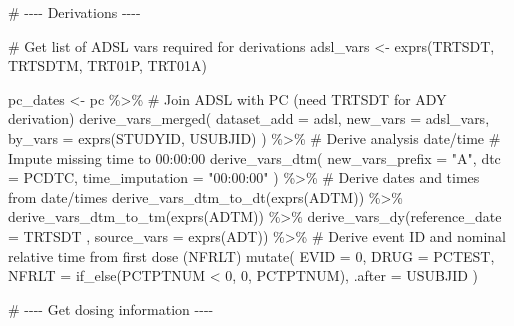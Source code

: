 \documentclass[
  letterpaper,
  DIV=11,
  numbers=noendperiod]{scrreprt}
\newenvironment{Shaded}{\begin{snugshade}}{\end{snugshade}}
\newcommand{\AttributeTok}[1]{\textcolor[rgb]{0.40,0.45,0.13}{#1}}
\newcommand{\CommentTok}[1]{\textcolor[rgb]{0.37,0.37,0.37}{#1}}
\newcommand{\DecValTok}[1]{\textcolor[rgb]{0.68,0.00,0.00}{#1}}
\newcommand{\FunctionTok}[1]{\textcolor[rgb]{0.28,0.35,0.67}{#1}}
\newcommand{\NormalTok}[1]{\textcolor[rgb]{0.00,0.23,0.31}{#1}}
\newcommand{\OtherTok}[1]{\textcolor[rgb]{0.00,0.23,0.31}{#1}}
\newcommand{\SpecialCharTok}[1]{\textcolor[rgb]{0.37,0.37,0.37}{#1}}
\newcommand{\StringTok}[1]{\textcolor[rgb]{0.13,0.47,0.30}{#1}}
\begin{document}
\begin{Shaded}
\begin{Highlighting}[]
\CommentTok{\# {-}{-}{-}{-} Derivations {-}{-}{-}{-}}

\CommentTok{\# Get list of ADSL vars required for derivations}
\NormalTok{adsl\_vars }\OtherTok{\textless{}{-}} \FunctionTok{exprs}\NormalTok{(TRTSDT, TRTSDTM, TRT01P, TRT01A)}

\NormalTok{pc\_dates }\OtherTok{\textless{}{-}}\NormalTok{ pc }\SpecialCharTok{\%\textgreater{}\%}
  \CommentTok{\# Join ADSL with PC (need TRTSDT for ADY derivation)}
  \FunctionTok{derive\_vars\_merged}\NormalTok{(}
    \AttributeTok{dataset\_add =}\NormalTok{ adsl,}
    \AttributeTok{new\_vars =}\NormalTok{ adsl\_vars,}
    \AttributeTok{by\_vars =} \FunctionTok{exprs}\NormalTok{(STUDYID, USUBJID)}
\NormalTok{  ) }\SpecialCharTok{\%\textgreater{}\%}
  \CommentTok{\# Derive analysis date/time}
  \CommentTok{\# Impute missing time to 00:00:00}
  \FunctionTok{derive\_vars\_dtm}\NormalTok{(}
    \AttributeTok{new\_vars\_prefix =} \StringTok{"A"}\NormalTok{,}
    \AttributeTok{dtc =}\NormalTok{ PCDTC,}
    \AttributeTok{time\_imputation =} \StringTok{"00:00:00"}
\NormalTok{  ) }\SpecialCharTok{\%\textgreater{}\%}
  \CommentTok{\# Derive dates and times from date/times}
  \FunctionTok{derive\_vars\_dtm\_to\_dt}\NormalTok{(}\FunctionTok{exprs}\NormalTok{(ADTM)) }\SpecialCharTok{\%\textgreater{}\%}
  \FunctionTok{derive\_vars\_dtm\_to\_tm}\NormalTok{(}\FunctionTok{exprs}\NormalTok{(ADTM)) }\SpecialCharTok{\%\textgreater{}\%}
  \FunctionTok{derive\_vars\_dy}\NormalTok{(}\AttributeTok{reference\_date =}\NormalTok{ TRTSDT ,}
                 \AttributeTok{source\_vars =} \FunctionTok{exprs}\NormalTok{(ADT)) }\SpecialCharTok{\%\textgreater{}\%}
  \CommentTok{\# Derive event ID and nominal relative time from first dose (NFRLT)}
  \FunctionTok{mutate}\NormalTok{(}
    \AttributeTok{EVID =} \DecValTok{0}\NormalTok{,}
    \AttributeTok{DRUG =}\NormalTok{ PCTEST,}
    \AttributeTok{NFRLT =} \FunctionTok{if\_else}\NormalTok{(PCTPTNUM }\SpecialCharTok{\textless{}} \DecValTok{0}\NormalTok{, }\DecValTok{0}\NormalTok{, PCTPTNUM), }\AttributeTok{.after =}\NormalTok{ USUBJID}
\NormalTok{  )}

\CommentTok{\# {-}{-}{-}{-} Get dosing information {-}{-}{-}{-}}


\end{Highlighting}
\end{Shaded}
\end{document}
